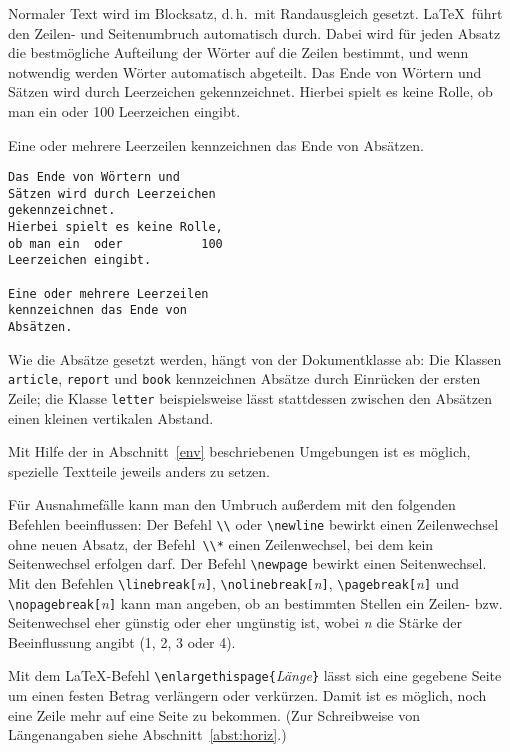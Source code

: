 Normaler Text wird im Blocksatz, d.\,h.~mit Randausgleich
gesetzt.  \LaTeX\ führt den Zeilen- und Seitenumbruch
automatisch durch.  Dabei wird für jeden Absatz die
bestmögliche Aufteilung der Wörter auf die Zeilen bestimmt,
und wenn notwendig werden Wörter automatisch abgeteilt.
\exa
\parindent=17pt\relax
\noindent Das Ende von Wörtern und Sätzen wird durch Leerzeichen
gekennzeichnet.  Hierbei spielt es keine Rolle, ob man ein oder
100 Leerzeichen eingibt.
\par
Eine oder mehrere Leerzeilen
kennzeichnen das Ende von
Absätzen.
\exb
\begin{verbatim}
Das Ende von Wörtern und
Sätzen wird durch Leerzeichen 
gekennzeichnet.
Hierbei spielt es keine Rolle,
ob man ein  oder           100
Leerzeichen eingibt.
 
Eine oder mehrere Leerzeilen
kennzeichnen das Ende von
Absätzen.
\end{verbatim}
\exc
Wie die Absätze gesetzt werden, hängt von der Dokumentklasse ab: 
Die Klassen 
\texttt{article}, \texttt{report} und \texttt{book} kennzeichnen
Absätze durch Einrücken der ersten Zeile;
die Klasse \texttt{letter} beispielsweise lässt stattdessen 
zwischen den Absätzen einen kleinen vertikalen Abstand.

Mit Hilfe der in Abschnitt~\ref{env} beschriebenen Umgebungen ist
es möglich, spezielle Textteile jeweils anders zu setzen.
 
Für Ausnahmefälle kann man den Umbruch außerdem mit den
folgenden Befehlen beeinflussen:
Der Befehl \verb|\\| oder \verb|\newline| bewirkt einen
Zeilenwechsel ohne neuen Absatz, der Befehl~\verb|\\*| einen
Zeilenwechsel, bei dem kein Seitenwechsel erfolgen darf.
Der Befehl \verb|\newpage| bewirkt einen Seitenwechsel.
Mit den Befehlen
\verb|\linebreak[|\textit{n}\verb|]|,
\verb|\nolinebreak[|\textit{n}\verb|]|,
\verb|\pagebreak[|\textit{n}\verb|]|   und
\verb|\nopagebreak[|\textit{n}\verb|]|
kann man angeben, ob an bestimmten Stellen ein Zeilen- bzw.\ %
Seitenwechsel eher günstig oder eher ungünstig ist, wobei
\textit{n} die Stärke der Beeinflussung angibt (1, 2, 3 oder 4).

Mit dem \LaTeX-Befehl \verb:\enlargethispage{:\textit{Länge}\verb:}:
lässt sich eine gegebene Seite um einen festen Betrag
verlängern oder verkürzen. Damit ist es möglich, noch
eine Zeile mehr auf eine Seite zu bekommen. 
(Zur Schreibweise von Längenangaben siehe Abschnitt~\ref{abst:horiz}.)
 
